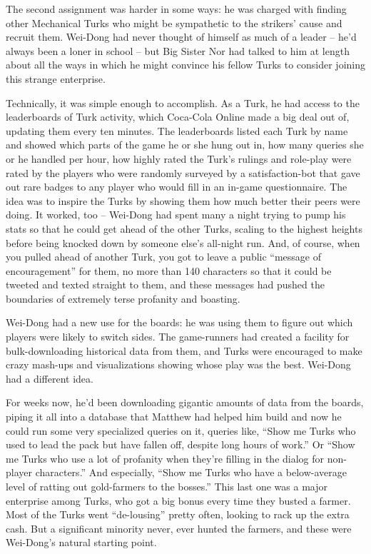 The second assignment was harder in some ways: he was charged with
finding other Mechanical Turks who might be sympathetic to the
strikers' cause and recruit them. Wei-Dong had never thought of
himself as much of a leader -- he'd always been a loner in school
-- but Big Sister Nor had talked to him at length about all the
ways in which he might convince his fellow Turks to consider
joining this strange enterprise.

Technically, it was simple enough to accomplish. As a Turk, he had
access to the leaderboards of Turk activity, which Coca-Cola Online
made a big deal out of, updating them every ten minutes. The
leaderboards listed each Turk by name and showed which parts of the
game he or she hung out in, how many queries she or he handled per
hour, how highly rated the Turk's rulings and role-play were rated
by the players who were randomly surveyed by a satisfaction-bot
that gave out rare badges to any player who would fill in an
in-game questionnaire. The idea was to inspire the Turks by showing
them how much better their peers were doing. It worked, too --
Wei-Dong had spent many a night trying to pump his stats so that he
could get ahead of the other Turks, scaling to the highest heights
before being knocked down by someone else's all-night run. And, of
course, when you pulled ahead of another Turk, you got to leave a
public ``message of encouragement'' for them, no more than 140
characters so that it could be tweeted and texted straight to them,
and these messages had pushed the boundaries of extremely terse
profanity and boasting.

Wei-Dong had a new use for the boards: he was using them to figure
out which players were likely to switch sides. The game-runners had
created a facility for bulk-downloading historical data from them,
and Turks were encouraged to make crazy mash-ups and visualizations
showing whose play was the best. Wei-Dong had a different idea.

For weeks now, he'd been downloading gigantic amounts of data from
the boards, piping it all into a database that Matthew had helped
him build and now he could run some very specialized queries on it,
queries like, ``Show me Turks who used to lead the pack but have
fallen off, despite long hours of work.'' Or ``Show me Turks who use
a lot of profanity when they're filling in the dialog for
non-player characters.'' And especially, ``Show me Turks who have a
below-average level of ratting out gold-farmers to the bosses.''
This last one was a major enterprise among Turks, who got a big
bonus every time they busted a farmer. Most of the Turks went
``de-lousing'' pretty often, looking to rack up the extra cash. But a
significant minority never, ever hunted the farmers, and these were
Wei-Dong's natural starting point.

